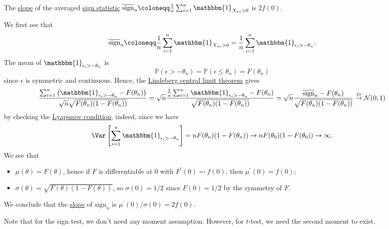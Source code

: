 \begin{eg}
	The \hyperref[def:slope]{slope} of the averaged \hyperref[def:sign-statistic]{sign statistic} \(\overline{\mathrm{sign}} _n \coloneqq \frac{1}{n} \sum_{i=1}^{n} \mathbbm{1}_{X_{ni} > 0} \) is \(2 f(0)\).
\end{eg}
\begin{explanation}
	We first see that
	\[
		\overline{\mathrm{sign}} _n
		\coloneqq \frac{1}{n} \sum_{i=1}^{n} \mathbbm{1}_{X_{ni} > 0}
		= \frac{1}{n} \sum_{i=1}^{n} \mathbbm{1}_{\epsilon _i > - \theta _n}.
	\]
	The mean of \(\mathbbm{1}_{\epsilon _i > -\theta _n} \) is
	\[
		\mathbb{P} (\epsilon > -\theta _n)
		= \mathbb{P} (\epsilon \leq \theta _n)
		= F(\theta _n)
	\]
	since \(\epsilon \) is symmetric and continuous. Hence, the \hyperref[thm:Lindeberg-CLT]{Lindeberg central limit theorem} gives
	\[
		\frac{\sum_{i=1}^{n} \left( \mathbbm{1}_{\epsilon _i  > -\theta _n} - F(\theta _n) \right) }{\sqrt{n} \sqrt{F(\theta _n) (1 - F(\theta _n))} }
		= \sqrt{n} \frac{\frac{1}{n} \sum_{i=1}^{n} \mathbbm{1}_{\epsilon _i > -\theta _n} - F(\theta _n) }{\sqrt{F(\theta _n) (1 - F(\theta _n)) } }
		= \sqrt{n} \frac{\overline{\mathrm{sign}} _n - F(\theta _n) }{\sqrt{F(\theta _n) (1 - F(\theta _n)) } }
		\overset{D}{\to} \mathcal{N} (0, 1)
	\]
	by checking the \hyperref[col:Lyapunov-CLT]{Lyapunov condition}, indeed, since we have
	\[
		\Var_{}\left[\sum_{i=1}^{n} \mathbbm{1}_{\epsilon _i > -\theta _n} \right]
		= n F(\theta _n) (1 - F(\theta _n))
		\to n F(\theta _0) (1 - F(\theta _0))
		\to \infty.
	\]
	We see that
	\begin{itemize}
		\item \(\mu (\theta ) = F(\theta ) \), hence if \(F\) is differentiable at \(0\) with \(F^{\prime} (0) \eqqcolon f(0)\), then \(\mu ^{\prime} (0) = f(0)\);
		\item \(\sigma (\theta ) = \sqrt{F(\theta )(1 - F(\theta ))} \), so \(\sigma (0) = 1 / 2\) since \(F(0) = 1 / 2\) by the symmetry of \(F\).
	\end{itemize}
	We conclude that the \hyperref[def:slope]{slope} of \(\overline{\mathrm{sign}} _n\) is \(\mu ^{\prime} (0) / \sigma (0) = 2f(0)\).
\end{explanation}

Note that for the sign test, we don't need any moment assumption. However, for \(t\)-test, we need the second moment to exist.

